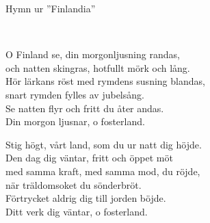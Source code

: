 \begin{song}{Hymn ur ''Finlandia''}
	
	
	\\
	
	O Finland se, din morgonljusning randas,\\
	och natten skingras, hotfullt mörk och lång.\\
	Hör lärkans röst med rymdens susning blandas,\\
	snart rymden fylles av jubelsång.\\
	Se natten flyr och fritt du åter andas.\\
	Din morgon ljusnar, o fosterland.
	
	Stig högt, vårt land, som du ur natt dig höjde.\\
	Den dag dig väntar, fritt och öppet möt\\
	med samma kraft, med samma mod, du röjde,\\
	när träldomsoket du sönderbröt.\\
	Förtrycket aldrig dig till jorden böjde.\\
	Ditt verk dig väntar, o fosterland.
	
\end{song}
